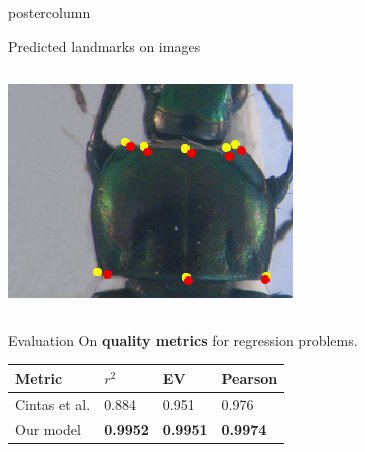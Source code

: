 \begin{frame}
\begin{columns}
\begin{column}{.49\textwidth}
\begin{beamercolorbox}[center,wd=\textwidth]{postercolumn}
\begin{minipage}[T]{.95\textwidth}
{\begin{block}{Predicted landmarks on images}
\begin{columns}
\begin{column}{.45\textwidth}
            			\includegraphics[width=.95\textwidth]{images/Prono_036.eps}
            		\end{column}
            	\end{columns}
            \end{block}
            
            \vfill
            
            \begin{block}{Evaluation}
            On \textbf{quality metrics} for regression problems. \\[0.2cm]
            \begin{center}            	
           		\begin{tabu} to 0.9\textwidth {| X[l] | X[c] | X[c] | X[c] |}
            		\hline
            		Metric & $r^2$ & EV & Pearson \\ \hline
            		Cintas et al.\cite{cintas2016automatic} & 0.884 & 0.951 & 0.976 \\ \hline                 		    		{} Our model & \textbf{0.9952} & \textbf{0.9951} & \textbf{0.9974} \\ \hline
            	\end{tabu}            
            	
            \end{center}
            

\end{block}}
\end{minipage}
\end{beamercolorbox}
\end{column}
\end{columns}
\end{frame}
